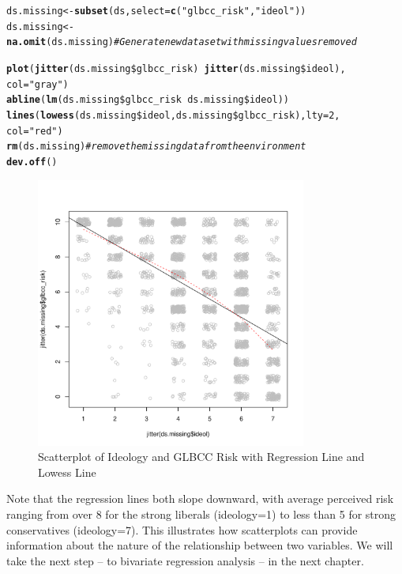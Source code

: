 \documentclass[11pt,openany]{book}\usepackage[]{graphicx}\usepackage[]{color}
\makeatletter
\newcommand{\hlnum}[1]{\textcolor[rgb]{0.686,0.059,0.569}{#1}}%
\newcommand{\hlstr}[1]{\textcolor[rgb]{0.192,0.494,0.8}{#1}}%
\newcommand{\hlcom}[1]{\textcolor[rgb]{0.678,0.584,0.686}{\textit{#1}}}%
\newcommand{\hlopt}[1]{\textcolor[rgb]{0,0,0}{#1}}%
\newcommand{\hlstd}[1]{\textcolor[rgb]{0.345,0.345,0.345}{#1}}%
\newcommand{\hlkwb}[1]{\textcolor[rgb]{0.69,0.353,0.396}{#1}}%
\newcommand{\hlkwc}[1]{\textcolor[rgb]{0.333,0.667,0.333}{#1}}%
\newcommand{\hlkwd}[1]{\textcolor[rgb]{0.737,0.353,0.396}{\textbf{#1}}}%
\newenvironment{kframe}{%
 \def\at@end@of@kframe{}%
 \ifinner\ifhmode%
  \def\at@end@of@kframe{\end{minipage}}%
  \begin{minipage}{\columnwidth}%
 \fi\fi%
 \def\FrameCommand##1{\hskip\@totalleftmargin \hskip-\fboxsep
 \colorbox{shadecolor}{##1}\hskip-\fboxsep
     \hskip-\linewidth \hskip-\@totalleftmargin \hskip\columnwidth}%
 \MakeFramed {\advance\hsize-\width
   \@totalleftmargin\z@ \linewidth\hsize
   \@setminipage}}%
 {\par\unskip\endMakeFramed%
 \at@end@of@kframe}
\newenvironment{knitrout}{}{} %
\renewenvironment{knitrout}{\begin{singlespace}}{\end{singlespace}}
\makeatother
\begin{document}
\begin{knitrout}
\color{fgcolor}\begin{kframe}
\begin{alltt}
\hlstd{ds.missing} \hlkwb{<-} \hlkwd{subset}\hlstd{(ds,} \hlkwc{select} \hlstd{=} \hlkwd{c}\hlstd{(}\hlstr{"glbcc_risk"}\hlstd{,} \hlstr{"ideol"}\hlstd{))}
\hlstd{ds.missing} \hlkwb{<-} \hlkwd{na.omit}\hlstd{(ds.missing)}  \hlcom{# Generate new dataset with missing values removed}

\hlkwd{plot}\hlstd{(}\hlkwd{jitter}\hlstd{(ds.missing}\hlopt{\$}\hlstd{glbcc_risk)} \hlopt{~} \hlkwd{jitter}\hlstd{(ds.missing}\hlopt{\$}\hlstd{ideol),}
    \hlkwc{col} \hlstd{=} \hlstr{"gray"}\hlstd{)}
\hlkwd{abline}\hlstd{(}\hlkwd{lm}\hlstd{(ds.missing}\hlopt{\$}\hlstd{glbcc_risk} \hlopt{~} \hlstd{ds.missing}\hlopt{\$}\hlstd{ideol))}
\hlkwd{lines}\hlstd{(}\hlkwd{lowess}\hlstd{(ds.missing}\hlopt{\$}\hlstd{ideol, ds.missing}\hlopt{\$}\hlstd{glbcc_risk),} \hlkwc{lty} \hlstd{=} \hlnum{2}\hlstd{,}
    \hlkwc{col} \hlstd{=} \hlstr{"red"}\hlstd{)}
\hlkwd{rm}\hlstd{(ds.missing)}  \hlcom{# remove the missing data from the environment}
\hlkwd{dev.off}\hlstd{()}
\end{alltt}
\end{kframe}
\end{knitrout}

\begin{figure}[!htp]
\includegraphics[width=3.5in, height=3.5in]{06_Association/scatjit2.pdf}%
\caption{Scatterplot of Ideology and GLBCC Risk with Regression Line and Lowess Line}
\end{figure}   

Note that the regression lines both slope downward, with average perceived risk  ranging from over 8 for the strong liberals (ideology=1) to less than 5 for strong conservatives (ideology=7). This illustrates how scatterplots can provide information about the nature of the relationship between two variables. We will take the next step -- to bivariate regression analysis -- in the next chapter.
\end{document}
